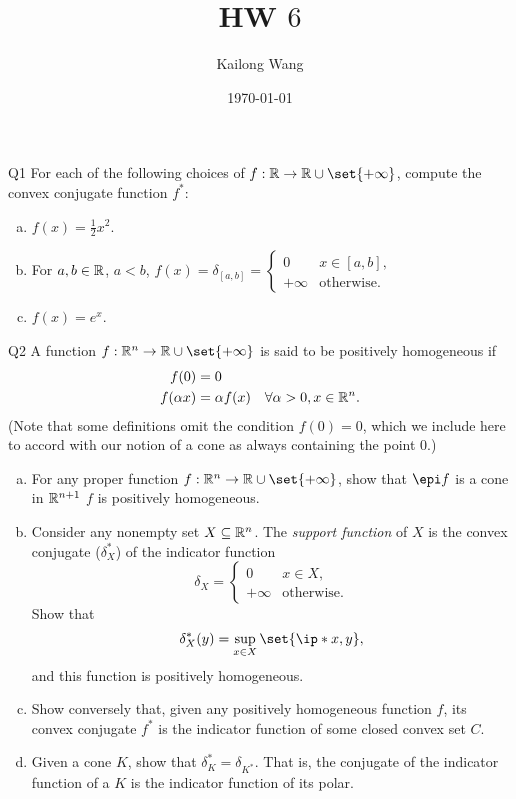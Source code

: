 \documentclass{article}
\title{HW $6$}
\author{Kailong Wang}
\date{\today}
\begin{document}
\maketitle

\begin{problem}
    {Q1}
    For each of the following choices of $f:\R\rightarrow \R \cup \set{+\infty}$, compute the convex conjugate function $f^*$:
    \begin{enumerate}[(a)]
        \item $f(x)=\frac{1}{2}x^2$.
        \item For $a ,b\in\mathbb{R}$, $a<b$, ${
            f(x)=\delta_{[a, b]}= \begin{cases}
                0 & x\in [a, b],\\
                +\infty & \text{otherwise}.
            \end{cases}
            }$
        \item $f(x)=e^x$.
    \end{enumerate}
\end{problem}

\begin{problem}
    {Q2}
    A function $f:\R^n\rightarrow\R\cup\set{+\infty}$ is said to be positively homogeneous if
    \begin{align*}
        f(0) &= 0 \\
        f(\alpha x) &= \alpha f(x) \quad \forall \alpha > 0, x\in\mathbb{R}^n.
    \end{align*}
    (Note that some definitions omit the condition $f(0) = 0$, which we include here to accord with our notion of a cone as always containing the point $0$.)
    \begin{enumerate}[(a)]
        \item For any proper function $f:\R^n\rightarrow\R\cup\set{+\infty}$, show that $\epi f$ is a cone in $\mathbb{R}^{n+1}$ \iff $f$ is positively homogeneous.
        \item Consider any nonempty set $X\subseteq\mathbb{R}^n$. The \textit{support function} of $X$ is the convex conjugate ($\delta_X^*$) of the indicator function \[\delta_X = \begin{cases}
            0 & x\in X,\\
            +\infty & \text{otherwise}.
        \end{cases}\]
        Show that \[\delta_X^*(y)=\sup_{x\in X}\set{\ip*{x, y}},\] and this function is positively homogeneous.
        \item Show conversely that, given any positively homogeneous function $f$, its convex conjugate $f^*$ is the indicator function of some closed convex set $C$.
        \item Given a cone $K$, show that $\delta_K^* = \delta_{K^*}$. That is, the conjugate of the indicator function of a $K$ is the indicator function of its polar.
    \end{enumerate}
\end{problem}
\end{document}
